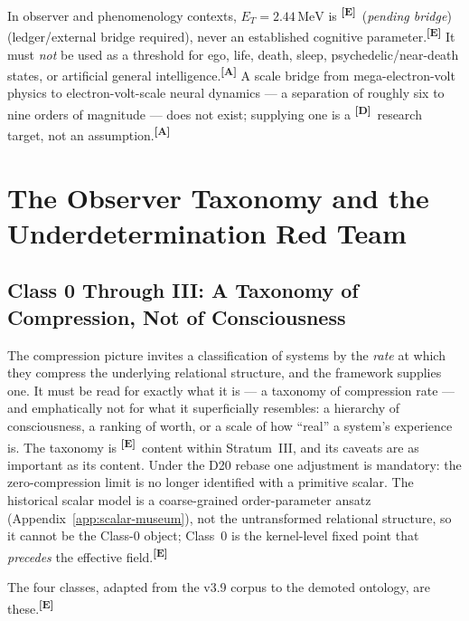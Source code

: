 \documentclass[12pt,a4paper,twoside]{article}
\theoremstyle{plain}
\theoremstyle{definition}
\theoremstyle{remark}
\newcommand{\MeV}{\,\mathrm{MeV}}
\newcommand{\catmark}[1]{\textsuperscript{\textsf{\textbf{[#1]}}}}
\newcommand{\ETorsion}{2.44\MeV} %
\begin{document}
\begin{governancebox}
In observer and phenomenology contexts, $E_T = \ETorsion$ is
\catmark{E}\ (\emph{pending bridge}) (ledger/external bridge required), never an
established cognitive parameter.\catmark{E} It must \emph{not} be used
as a threshold for ego, life, death, sleep, psychedelic/near-death
states, or artificial general intelligence.\catmark{A} A scale bridge
from mega-electron-volt physics to electron-volt-scale neural dynamics
--- a separation of roughly six to nine orders of magnitude --- does not
exist; supplying one is a \catmark{D}\ research target, not an
assumption.\catmark{A}
\end{governancebox}

\section{The Observer Taxonomy and the Underdetermination Red Team}
\label{sec:observer-taxonomy-underdetermination}

\subsection{Class 0 Through III: A Taxonomy of Compression, Not of Consciousness}
\label{subsec:observer-taxonomy}

The compression picture invites a classification of systems by the
\emph{rate} at which they compress the underlying relational structure, and
the framework supplies one. It must be read for exactly what it is --- a
taxonomy of compression rate --- and emphatically not for what it
superficially resembles: a hierarchy of consciousness, a ranking of worth,
or a scale of how ``real'' a system's experience is. The taxonomy is
\catmark{E}\ content within Stratum~III, and its caveats are as important
as its content. Under the D20 rebase one adjustment is mandatory:
the zero-compression limit is no longer identified with a primitive scalar.
The historical scalar model is a coarse-grained order-parameter ansatz (Appendix~\ref{app:scalar-museum}), not the
untransformed relational structure, so it cannot be the Class-0 object;
Class~0 is the kernel-level fixed point that \emph{precedes} the effective
field.\catmark{E}

The four classes, adapted from the v3.9 corpus to the demoted ontology, are
these.\catmark{E}
\end{document}
